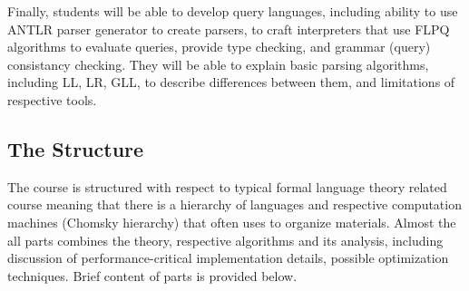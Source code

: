 \documentclass[sigconf]{acmart}
\begin{document}
Finally, students will be able to develop query languages, including ability to use ANTLR parser generator to create parsers, to craft interpreters that use FLPQ algorithms to evaluate queries, provide type checking, and grammar (query) consistancy checking. 
They will be able to explain basic parsing algorithms, including LL, LR, GLL, to describe differences between them, and limitations of respective tools. 


\subsection{The Structure}

The course is structured with respect to typical formal language theory related course meaning that there is a hierarchy of languages and respective computation machines (Chomsky hierarchy) that often uses to organize materials. 
Almost the all parts combines the theory, respective algorithms and its analysis, including discussion of performance-critical implementation details, possible optimization techniques. 
Brief content of parts is provided below.
\end{document}

